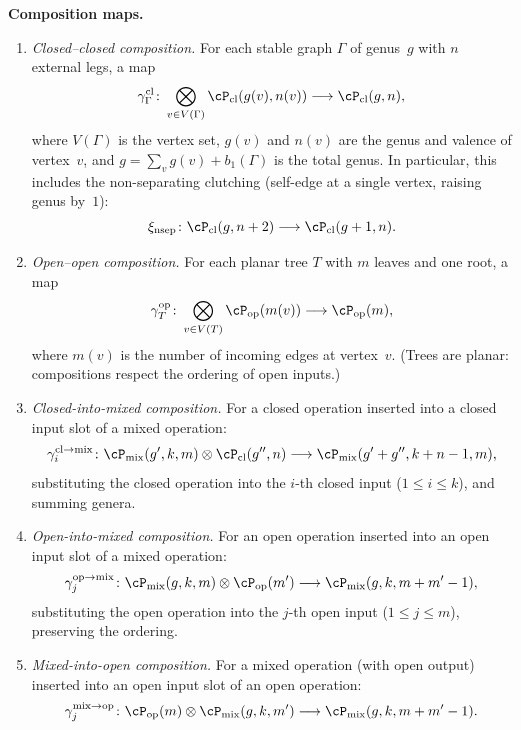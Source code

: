 \begin{definition}
\medskip\noindent\textbf{Composition maps.}
\begin{enumerate}[label=\textup{(C\arabic*)}]
\item \emph{Closed--closed composition.}
 For each stable graph $\Gamma$ of genus~$g$ with $n$ external legs,
 a map
 \[
 \gamma_\Gamma^{\mathrm{cl}}
 \colon
 \bigotimes_{v \in V(\Gamma)} \cP_{\mathrm{cl}}(g(v), n(v))
 \longrightarrow
 \cP_{\mathrm{cl}}(g, n),
 \]
 where $V(\Gamma)$ is the vertex set, $g(v)$ and $n(v)$ are the
 genus and valence of vertex~$v$, and
 $g = \sum_v g(v) + b_1(\Gamma)$ is the total genus.
 In particular, this includes the non-separating clutching
 (self-edge at a single vertex, raising genus by~$1$):
 \[
 \xi_{\mathrm{nsep}}
 \colon \cP_{\mathrm{cl}}(g, n+2)
 \longrightarrow \cP_{\mathrm{cl}}(g+1, n).
 \]

\item \emph{Open--open composition.}
 For each planar tree $T$ with $m$ leaves and one root, a map
 \[
 \gamma_T^{\mathrm{op}}
 \colon
 \bigotimes_{v \in V(T)} \cP_{\mathrm{op}}(m(v))
 \longrightarrow
 \cP_{\mathrm{op}}(m),
 \]
 where $m(v)$ is the number of incoming edges at vertex~$v$.
 (Trees are planar: compositions respect the ordering of open inputs.)

\item \emph{Closed-into-mixed composition.}
 For a closed operation inserted into a closed input slot of a mixed
 operation:
 \[
 \gamma^{\mathrm{cl} \to \mathrm{mix}}_i
 \colon
 \cP_{\mathrm{mix}}(g', k, m) \otimes \cP_{\mathrm{cl}}(g'', n)
 \longrightarrow
 \cP_{\mathrm{mix}}(g' + g'', k + n - 1, m),
 \]
 substituting the closed operation into the $i$-th closed input
 ($1 \le i \le k$), and summing genera.

\item \emph{Open-into-mixed composition.}
 For an open operation inserted into an open input slot of a mixed
 operation:
 \[
 \gamma^{\mathrm{op} \to \mathrm{mix}}_j
 \colon
 \cP_{\mathrm{mix}}(g, k, m) \otimes \cP_{\mathrm{op}}(m')
 \longrightarrow
 \cP_{\mathrm{mix}}(g, k, m + m' - 1),
 \]
 substituting the open operation into the $j$-th open input
 ($1 \le j \le m$), preserving the ordering.

\item \emph{Mixed-into-open composition.}
 For a mixed operation (with open output) inserted into an
 open input slot of an open operation:
 \[
 \gamma^{\mathrm{mix} \to \mathrm{op}}_j
 \colon
 \cP_{\mathrm{op}}(m) \otimes \cP_{\mathrm{mix}}(g, k, m')
 \longrightarrow
 \cP_{\mathrm{mix}}(g, k, m + m' - 1).
 \]


\end{enumerate}
\end{definition}
